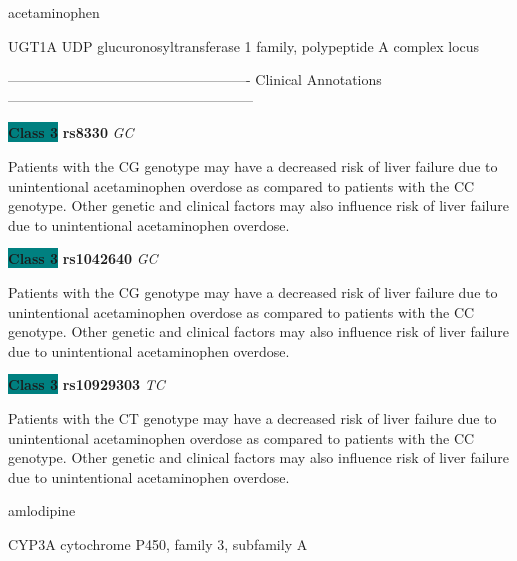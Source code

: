 \documentclass{resume} %
\begin{document}
\begin{rSection}{ acetaminophen }
\begin{rSubsection}{ UGT1A }{ UDP glucuronosyltransferase 1 family, polypeptide A complex locus }{}{}
\item[]

\item[] ---------------------------------------------------- Clinical Annotations -----------------------------------------------------\newline
\item \textbf{\colorbox{teal} {Class 3}} \textbf{ rs8330 } \textit{ GC }
\item[] Patients with the CG genotype may have a decreased risk of liver failure due to unintentional acetaminophen overdose as compared to patients with the CC genotype. Other genetic and clinical factors may also influence risk of liver failure due to unintentional acetaminophen overdose.\item \textbf{\colorbox{teal} {Class 3}} \textbf{ rs1042640 } \textit{ GC }
\item[] Patients with the CG genotype may have a decreased risk of liver failure due to unintentional acetaminophen overdose as compared to patients with the CC genotype. Other genetic and clinical factors may also influence risk of liver failure due to unintentional acetaminophen overdose.\item \textbf{\colorbox{teal} {Class 3}} \textbf{ rs10929303 } \textit{ TC }
\item[] Patients with the CT genotype may have a decreased risk of liver failure due to unintentional acetaminophen overdose as compared to patients with the CC genotype. Other genetic and clinical factors may also influence risk of liver failure due to unintentional acetaminophen overdose.
\end{rSubsection}

\end{rSection}\begin{rSection}{ amlodipine }
\item[]

\begin{rSubsection}{ CYP3A }{ cytochrome P450, family 3, subfamily A }{}{}
\item[]


\end{rSubsection}
\end{rSection}
\end{document}
